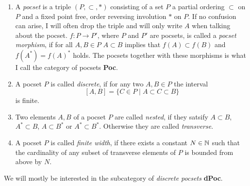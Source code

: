 \begin{defin}
  \begin{enumerate}
  \item A \emph{pocset} is a triple \((P, \subset, \ast)\) consisting of a set \(P\) a partial ordering \(\subset\) on \(P\) and a fixed point free, order reversing involution \(\ast\) on \(P\). If no confusion can arise, I will often drop the triple and will only write \(A\) when talking about the pocset. \(f \colon P \to P'\), where \(P\) and \(P'\) are pocsets, is called a \emph{pocset morphism}, if for all \(A, B \in P\) \(A \subset B\) implies that \(f(A) \subset f(B)\) and \(f(A^\ast) = f(A)^\ast\) holds. The pocsets together with these morphisms is what I call the category of pocsets {\textbf{Poc}}.
  \item A pocset \(P\) is called \emph{discrete}, if for any two \(A, B \in P\) the interval
    \[
      [A,B] = \{C \in P \mid A \subset C \subset B\}
    \]
    is finite.
  \item Two elements \(A,B\) of a pocset \(P\) are called \emph{nested}, if they satsify \(A \subset B\), \(A^\ast \subset B\), \(A \subset B^\ast\) or \(A^\ast \subset B^\ast\). Otherwise they are called \emph{transverse}.
  \item A pocset \(P\) is called \emph{finite width}, if there exists a constant \(N \in \mathbb{N}\) such that the cardinality of any subset of transverse elements of \(P\) is bounded from above by \(N\).
  \end{enumerate}
  We will mostly be interested in the subcategory of \emph{discrete pocsets} \textbf{dPoc}.
\end{defin}

